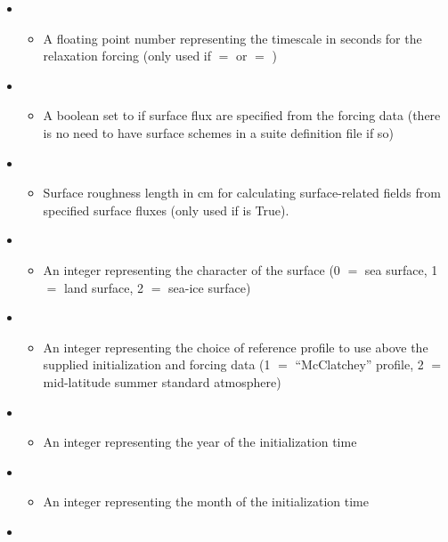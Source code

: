 \begin{itemize}
\begin{itemize}
	\end{itemize}
\item {}
	\begin{itemize}
	\item A floating point number representing the timescale in seconds for the relaxation forcing (only used if  $=$  or  $=$ )
	\end{itemize}
\item {}
	\begin{itemize}
	\item A boolean set to  if surface flux are specified from the forcing data (there is no need to have surface schemes in a suite definition file if so)
	\end{itemize}
\item {}
	\begin{itemize}
	\item Surface roughness length in cm for calculating surface-related fields from specified surface fluxes (only used if  is True).
	\end{itemize}
\item {}
	\begin{itemize}
	\item An integer representing the character of the surface (0 $=$ sea surface, 1 $=$ land surface, 2 $=$ sea-ice surface)
	\end{itemize}
\item {}
	\begin{itemize}
	\item An integer representing the choice of reference profile to use above the supplied initialization and forcing data (1 $=$ ``McClatchey'' profile, 2 $=$ mid-latitude summer standard atmosphere)
	\end{itemize}
\item {}
	\begin{itemize}
	\item An integer representing the year of the initialization time
	\end{itemize}
\item {}
	\begin{itemize}
	\item An integer representing the month of the initialization time
	\end{itemize}
\item {}

\end{itemize}
